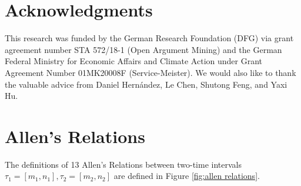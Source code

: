 \documentclass[letterpaper]{article} %
\begin{document}
\section*{Acknowledgments}
This research was funded by the German Research Foundation (DFG) via grant agreement number STA 572/18-1 (Open Argument Mining) and the German Federal Ministry for Economic Affairs and Climate Action under Grant Agreement Number 01MK20008F (Service-Meister). We would also like to thank the valuable advice from Daniel Hernández, Le Chen, Shutong Feng, and Yaxi Hu.






\clearpage
\appendix

\section{Allen's Relations}
\label{Allen's Relations}
The definitions of 13 Allen’s Relations between two-time intervals $\tau_1=[m_1,n_1], \tau_2=[m_2,n_2]$ are defined in Figure \ref{fig:allen relations}.
\end{document}
